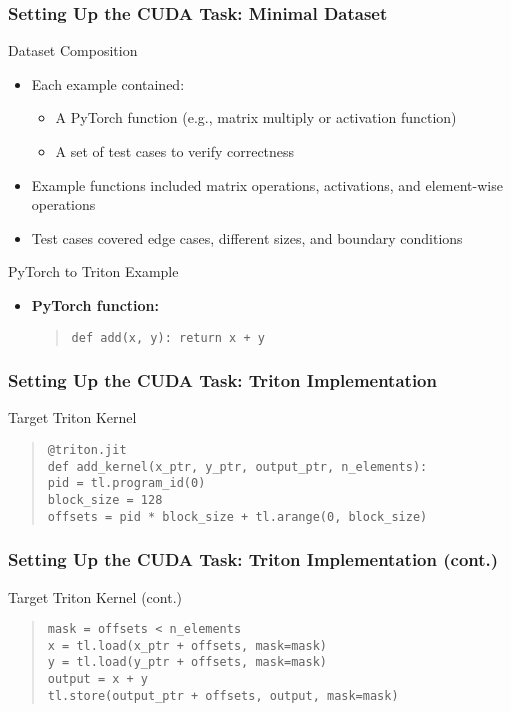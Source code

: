 \documentclass[aspectratio=169]{beamer}
\begin{document}
\begin{frame}
	\frametitle{Setting Up the CUDA Task: Minimal Dataset}
	\begin{block}{Dataset Composition}
		\begin{itemize}
			\item Each example contained:
			\begin{itemize}
				\item A PyTorch function (e.g., matrix multiply or activation function)
				\item A set of test cases to verify correctness
			\end{itemize}
			\item Example functions included matrix operations, activations, and element-wise operations
			\item Test cases covered edge cases, different sizes, and boundary conditions
		\end{itemize}
	\end{block}
	\begin{block}{PyTorch to Triton Example}
	\begin{itemize}
		\item \textbf{PyTorch function:}
		\begin{quote}
		\texttt{def add(x, y): return x + y}
		\end{quote}
	\end{itemize}
	\end{block}
\end{frame}

\begin{frame}
	\frametitle{Setting Up the CUDA Task: Triton Implementation}
	\begin{block}{Target Triton Kernel}
	\begin{quote}
	\texttt{@triton.jit}\\  
	\texttt{def add\_kernel(x\_ptr, y\_ptr, output\_ptr, n\_elements):}\\  
	\texttt{\phantom{xxxx}pid = tl.program\_id(0)}\\  
	\texttt{\phantom{xxxx}block\_size = 128}\\  
	\texttt{\phantom{xxxx}offsets = pid * block\_size + tl.arange(0, block\_size)}
	\end{quote}
	\end{block}
\end{frame}

\begin{frame}
	\frametitle{Setting Up the CUDA Task: Triton Implementation (cont.)}
	\begin{block}{Target Triton Kernel (cont.)}
	\begin{quote}
	\texttt{\phantom{xxxx}mask = offsets < n\_elements}\\  
	\texttt{\phantom{xxxx}x = tl.load(x\_ptr + offsets, mask=mask)}\\  
	\texttt{\phantom{xxxx}y = tl.load(y\_ptr + offsets, mask=mask)}\\  
	\texttt{\phantom{xxxx}output = x + y}\\  
	\texttt{\phantom{xxxx}tl.store(output\_ptr + offsets, output, mask=mask)}
	\end{quote}
	\end{block}
\end{frame}
\end{document}
